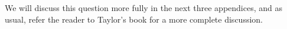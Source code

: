      We will discuss this question more fully in the next three
appendices, and as usual, refer the reader to Taylor's book for a more
complete discussion.



